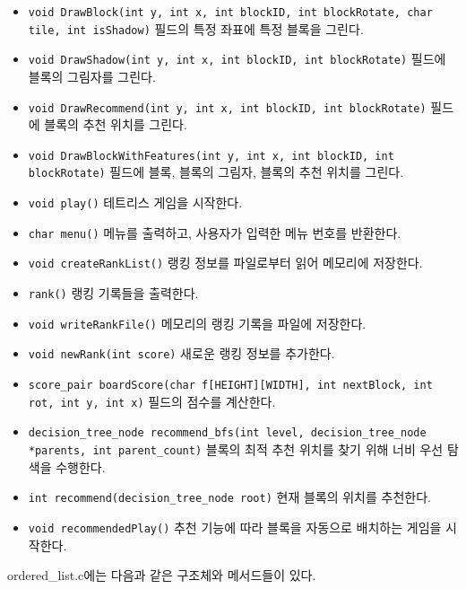 \begin{itemize}
    \item \texttt{void DrawBlock(int y, int x, int blockID, int blockRotate, char tile, int isShadow)}
    필드의 특정 좌표에 특정 블록을 그린다.
    \item \texttt{void DrawShadow(int y, int x, int blockID, int blockRotate)}
    필드에 블록의 그림자를 그린다.
    \item \texttt{void DrawRecommend(int y, int x, int blockID, int blockRotate)}
    필드에 블록의 추천 위치를 그린다.
    \item \texttt{void DrawBlockWithFeatures(int y, int x, int blockID, int blockRotate)}
    필드에 블록, 블록의 그림자, 블록의 추천 위치를 그린다.
    \item \texttt{void play()}
    테트리스 게임을 시작한다.
    \item \texttt{char menu()}
    메뉴를 출력하고, 사용자가 입력한 메뉴 번호를 반환한다.
    \item \texttt{void createRankList()}
    랭킹 정보를 파일로부터 읽어 메모리에 저장한다.
    \item \texttt{rank()}
    랭킹 기록들을 출력한다.
    \item \texttt{void writeRankFile()}
    메모리의 랭킹 기록을 파일에 저장한다.
    \item \texttt{void newRank(int score)}
    새로운 랭킹 정보를 추가한다.
    \item \texttt{score_pair boardScore(char f[HEIGHT][WIDTH], int nextBlock, int rot, int y, int x)}
    필드의 점수를 계산한다.
    \item \texttt{decision_tree_node recommend_bfs(int level, decision_tree_node *parents, int parent_count)}
    블록의 최적 추천 위치를 찾기 위해 너비 우선 탐색을 수행한다.
    \item \texttt{int recommend(decision_tree_node root)}
    현재 블록의 위치를 추천한다.
    \item \texttt{void recommendedPlay()}
    추천 기능에 따라 블록을 자동으로 배치하는 게임을 시작한다.
\end{itemize}

ordered_list.c에는 다음과 같은 구조체와 메서드들이 있다.

